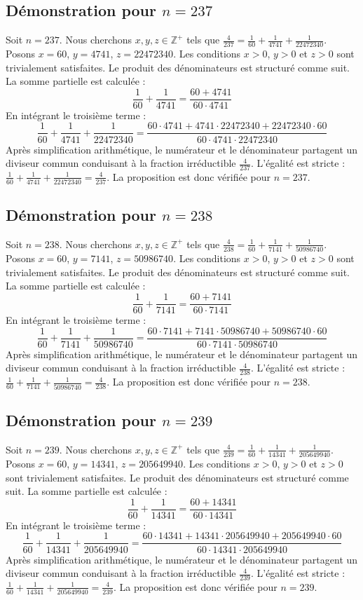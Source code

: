 \documentclass[11pt,a4paper]{article}
\begin{document}
\subsection{Démonstration pour $n = 237$}
Soit $n = 237$. Nous cherchons $x, y, z \in \mathbb{Z}^{+}$ tels que $\frac{4}{237} = \frac{1}{60} + \frac{1}{4741} + \frac{1}{22472340}$.
Posons $x = 60$, $y = 4741$, $z = 22472340$.
Les conditions $x > 0$, $y > 0$ et $z > 0$ sont trivialement satisfaites.
Le produit des dénominateurs est structuré comme suit. La somme partielle est calculée :
$$ \frac{1}{60} + \frac{1}{4741} = \frac{60+4741}{60 \cdot 4741} $$
En intégrant le troisième terme :
$$ \frac{1}{60} + \frac{1}{4741} + \frac{1}{22472340} = \frac{60 \cdot 4741 + 4741 \cdot 22472340 + 22472340 \cdot 60}{60 \cdot 4741 \cdot 22472340} $$
Après simplification arithmétique, le numérateur et le dénominateur partagent un diviseur commun conduisant à la fraction irréductible $\frac{4}{237}$.
L'égalité est stricte : $\frac{1}{60} + \frac{1}{4741} + \frac{1}{22472340} = \frac{4}{237}$.
La proposition est donc vérifiée pour $n = 237$.
\subsection{Démonstration pour $n = 238$}
Soit $n = 238$. Nous cherchons $x, y, z \in \mathbb{Z}^{+}$ tels que $\frac{4}{238} = \frac{1}{60} + \frac{1}{7141} + \frac{1}{50986740}$.
Posons $x = 60$, $y = 7141$, $z = 50986740$.
Les conditions $x > 0$, $y > 0$ et $z > 0$ sont trivialement satisfaites.
Le produit des dénominateurs est structuré comme suit. La somme partielle est calculée :
$$ \frac{1}{60} + \frac{1}{7141} = \frac{60+7141}{60 \cdot 7141} $$
En intégrant le troisième terme :
$$ \frac{1}{60} + \frac{1}{7141} + \frac{1}{50986740} = \frac{60 \cdot 7141 + 7141 \cdot 50986740 + 50986740 \cdot 60}{60 \cdot 7141 \cdot 50986740} $$
Après simplification arithmétique, le numérateur et le dénominateur partagent un diviseur commun conduisant à la fraction irréductible $\frac{4}{238}$.
L'égalité est stricte : $\frac{1}{60} + \frac{1}{7141} + \frac{1}{50986740} = \frac{4}{238}$.
La proposition est donc vérifiée pour $n = 238$.
\subsection{Démonstration pour $n = 239$}
Soit $n = 239$. Nous cherchons $x, y, z \in \mathbb{Z}^{+}$ tels que $\frac{4}{239} = \frac{1}{60} + \frac{1}{14341} + \frac{1}{205649940}$.
Posons $x = 60$, $y = 14341$, $z = 205649940$.
Les conditions $x > 0$, $y > 0$ et $z > 0$ sont trivialement satisfaites.
Le produit des dénominateurs est structuré comme suit. La somme partielle est calculée :
$$ \frac{1}{60} + \frac{1}{14341} = \frac{60+14341}{60 \cdot 14341} $$
En intégrant le troisième terme :
$$ \frac{1}{60} + \frac{1}{14341} + \frac{1}{205649940} = \frac{60 \cdot 14341 + 14341 \cdot 205649940 + 205649940 \cdot 60}{60 \cdot 14341 \cdot 205649940} $$
Après simplification arithmétique, le numérateur et le dénominateur partagent un diviseur commun conduisant à la fraction irréductible $\frac{4}{239}$.
L'égalité est stricte : $\frac{1}{60} + \frac{1}{14341} + \frac{1}{205649940} = \frac{4}{239}$.
La proposition est donc vérifiée pour $n = 239$.
\end{document}
